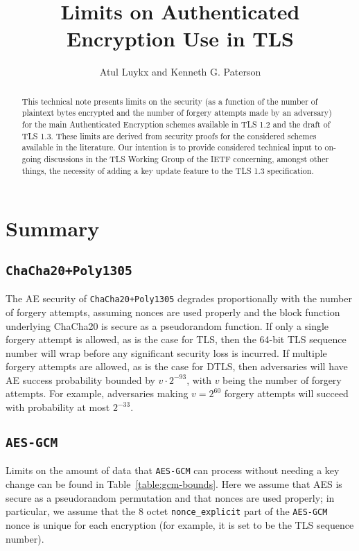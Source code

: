 \documentclass{article}
\title{Limits on Authenticated Encryption Use in TLS}
\author{Atul Luykx and Kenneth G. Paterson}
\begin{document}
\maketitle


\begin{abstract}
This technical note presents limits on the security (as a function of the number of plaintext bytes encrypted and the number of forgery attempts made by an adversary) for the main Authenticated Encryption schemes available in TLS 1.2 and the draft of TLS 1.3. These limits are derived from security proofs for the considered schemes available in the literature. Our intention is to provide considered technical input to on-going discussions in the TLS Working Group of the IETF concerning, amongst other things, the necessity of adding a key update feature to the TLS 1.3 specification. 
\end{abstract}


\section{Summary}

\subsection{\texttt{ChaCha20+Poly1305}}
The AE security of \texttt{ChaCha20+Poly1305} degrades proportionally with the number of forgery attempts, assuming nonces are used properly and the block function underlying ChaCha20 is secure as a pseudorandom function. If only a single forgery attempt is allowed, as is the case for TLS, then the 64-bit TLS sequence number will wrap before any significant security loss is incurred. If multiple forgery attempts are allowed, as is the case for DTLS, then adversaries will have AE success probability bounded by $v\cdot 2^{-93}$, with $v$ being the number of forgery attempts. For example, adversaries making $v = 2^{60}$ forgery attempts will succeed with probability at most $2^{-33}$.

\subsection{ \texttt{AES-GCM} }

Limits on the amount of data that \texttt{AES-GCM} can process without needing a key change can be found in Table~\ref{table:gcm-bounds}. Here we  assume that AES is secure as a pseudorandom permutation and that nonces are used properly; in particular, we assume that the 8 octet \verb|nonce_explicit| part of the \texttt{AES-GCM} nonce is unique for each encryption (for example, it is set to be the TLS sequence number). 
\end{document}
